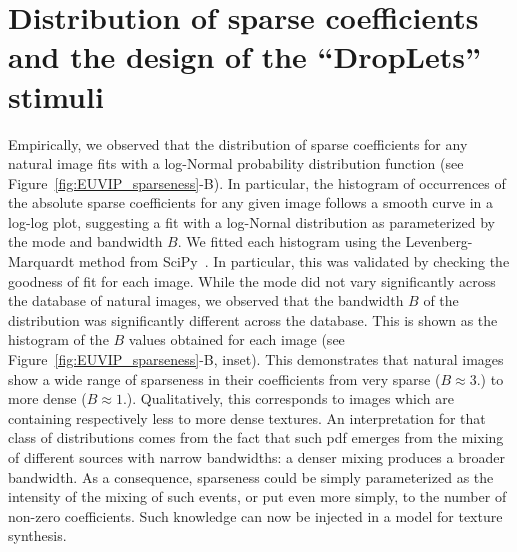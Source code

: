 \documentclass{article}
\begin{document}
\section{Distribution of sparse coefficients and the design of the ``DropLets'' stimuli}
Empirically, we observed that the distribution of sparse coefficients for any natural image fits with a log-Normal probability distribution function (see Figure~\ref{fig:EUVIP_sparseness}-B). In particular, the histogram of occurrences of the absolute sparse coefficients for any given image follows a smooth curve in a log-log plot, suggesting a fit with a log-Nornal distribution as parameterized by the mode and bandwidth $B$. We fitted each histogram using the Levenberg-Marquardt method from SciPy~\citep{Oliphant07}. In particular, this was validated by checking the goodness of fit for each image. While the mode did not vary significantly across the database of natural images, we observed that the bandwidth $B$ of the distribution was significantly different across the database. This is shown as the histogram of the $B$ values obtained for each image (see Figure~\ref{fig:EUVIP_sparseness}-B, inset). This demonstrates that natural images show a wide range of sparseness in their coefficients from very sparse ($B\approx 3.$) to more dense ($B\approx 1.$). Qualitatively, this corresponds to images which are containing respectively less to more dense textures. An interpretation for that class of distributions comes from the fact that such pdf emerges from the mixing of different sources with narrow bandwidths: a denser mixing produces a broader bandwidth. As a consequence, sparseness could be simply parameterized as the intensity of the mixing of such events, or put even more simply, to the number of non-zero coefficients. Such knowledge can now be injected in a model for texture synthesis.
\end{document}
